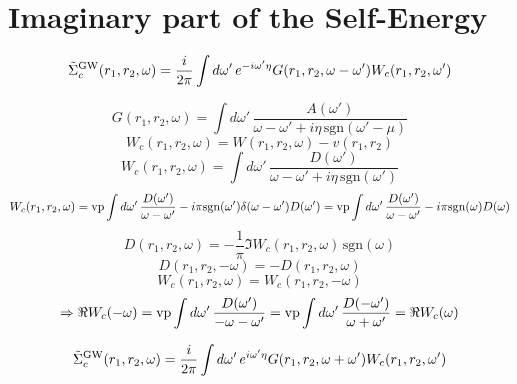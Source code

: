 \documentclass[fleqn]{article}
\begin{document}
\newpage


\section{Imaginary part of the Self-Energy}

\[
  \tilde{\Sigma}^{\rm GW}_c(r_1,r_2,\omega) =
  \frac{i}{2 \pi} \int d\omega' \, e^{-i \omega' \eta}
  G(r_1,r_2,\omega-\omega')
  W_c(r_1,r_2,\omega')
\]


\[
G(r_1,r_2,\omega) = \int d\omega' \, \frac{A(\omega')}{\omega-\omega'+i\eta \mathrm{\, sgn}(\omega'-\mu)}
\]
\[
W_c(r_1,r_2,\omega) = W(r_1,r_2,\omega) - v(r_1,r_2)
\]
\[
W_c(r_1,r_2,\omega) = \int d\omega' \, \frac{D(\omega')}{\omega-\omega'+i\eta \mathrm{\, sgn}(\omega')}
\]
\[
W_c(r_1,r_2,\omega) = {\rm vp} \int d\omega' \, \frac{D(\omega')}{\omega-\omega'}
  - i \pi {\rm sgn}(\omega') \delta(\omega-\omega') D(\omega') =
  {\rm vp} \int d\omega' \, \frac{D(\omega')}{\omega-\omega'}
  - i \pi {\rm sgn}(\omega) D(\omega)
\]
\[
D(r_1,r_2,\omega) = - \frac{1}{\pi} \Im W_c(r_1,r_2,\omega) \mathrm{\, sgn}(\omega)
\]
\[
D(r_1,r_2,-\omega) = - D(r_1,r_2,\omega)
\]
\[
  W_c(r_1,r_2,\omega) = W_c(r_1,r_2,-\omega)
\]
\[
  \Rightarrow \Re W_c(-\omega) = {\rm vp} \int d\omega' \, \frac{D(\omega')}{-\omega-\omega'}
    = {\rm vp} \int d\omega' \, \frac{D(-\omega')}{\omega+\omega'} = \Re W_c(\omega)
\]

\[
  \tilde{\Sigma}^{\rm GW}_c(r_1,r_2,\omega) =
  \frac{i}{2 \pi} \int d\omega' \, e^{i \omega' \eta}
  G(r_1,r_2,\omega+\omega')
  W_c(r_1,r_2,\omega')
\]
\end{document}
